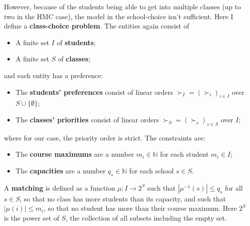 \documentclass[12pt,letterpaper]{extarticle}
\begin{document}
However, because of the students being able to get into multiple classes (up to two in the HMC case), the model in the school-choice isn't sufficient. Here I define a \textbf{class-choice problem}. The entities again consist of
\begin{itemize}
    \item A finite set $I$ of \textbf{students};
    \item A finite set $S$ of \textbf{classes};
\end{itemize}
and each entity has a preference:
\begin{itemize}
    \item The \textbf{students' preferences} consist of linear orders $\succ_I = (\succ_i)_{i \in I}$ over $S \cup \{\emptyset\}$;
    \item The \textbf{classes' priorities} consist of linear orders $\succ_S = (\succ_s)_{s \in S}$ over $I$;
\end{itemize}
where for our case, the priority order is strict. The constraints are:
\begin{itemize}
    \item The \textbf{course maximums} are a number $m_i \in \mathbb{N}$ for each student $m_i \in I$;
    \item The \textbf{capacities} are a number $q_s \in \mathbb{N}$ for each school $s \in S$.
\end{itemize}
A \textbf{matching} is defined as a function $\mu : I \to 2^S$ such that $|\mu^{-1}(s)| \leq q_s$ for all $s \in S$, so that no class has more students than its capacity, and such that $|\mu(i)| \leq m_i$, so that no student has more than their course maximum. Here $2^S$ is the power set of $S$, the collection of all subsets including the empty set.
\end{document}
